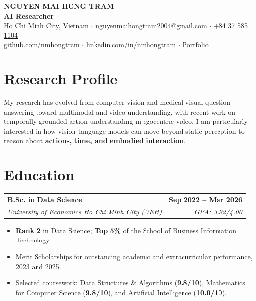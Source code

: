 \documentclass[a4paper,10pt]{article}
\makeatletter
\newcommand{\cvitem}{\itemsep0.85mm\parskip0pt\parsep0pt}
\newcommand{\bulletliststart}{\begin{itemize}[leftmargin=4.2mm,label=\raisebox{0.2ex}{\tiny$\bullet$},topsep=1.3mm] \cvitem}
\newcommand{\bulletlistend}{\end{itemize}\vspace{0.6mm}}
\newcommand{\entry}[4]{%
  \par\noindent
  \begin{tabularx}{\textwidth}{@{}Xr@{}}
    \textbf{#1} & \textbf{#2} \\
    \textit{#3} & \textit{#4}
  \end{tabularx}
  \par\vspace{0.5mm}
}
\newcommand{\email}{nguyenmaihongtram2004@gmail.com}
\newcommand{\phone}{+84 37 585 1104}
\newcommand{\github}{nmhongtram}
\newcommand{\linkedin}{nmhongtram}
\newcommand{\portfolio}{https://fair-porter-fe4.notion.site/Portfolio-Nguyen-Mai-Hong-Tram-2247aaf6f1728085be67f5484c4bef44?source=copy_link}
\makeatother
\begin{document}
\selectfont

\begin{center}
  {\LARGE\bfseries NGUYEN MAI HONG TRAM}\\[1.2mm]
  {\large\bfseries\color{accent} AI Researcher}\\[1.8mm]
  {\small
    \faMapMarker\hspace{0.8mm}Ho Chi Minh City, Vietnam
    \hspace{1.4mm}$\cdot$\hspace{1.4mm}
    \href{mailto:\email}{\faEnvelope\hspace{0.8mm}\email}
    \hspace{1.4mm}$\cdot$\hspace{1.4mm}
    \href{tel:+84375851104}{\faPhone\hspace{0.8mm}\phone}\\[0.8mm]
    \href{https://github.com/\github}{\faGithub\hspace{0.8mm}github.com/\github}
    \hspace{1.4mm}$\cdot$\hspace{1.4mm}
    \href{https://www.linkedin.com/in/\linkedin/}{\faLinkedinSquare\hspace{0.8mm}linkedin.com/in/\linkedin}
    \hspace{1.4mm}$\cdot$\hspace{1.4mm}
    \href{\portfolio}{\faGlobe\hspace{0.8mm}Portfolio}
  }
\end{center}
\vspace{0.5mm}

\section{Research Profile}
\justifying
My research has evolved from computer vision and medical visual question answering toward multimodal and video understanding, with recent work on temporally grounded action understanding in egocentric video. I am particularly interested in how vision--language models can move beyond static perception to reason about \textbf{actions, time, and embodied interaction}.

\section{Education}
\entry
  {B.Sc. in Data Science}
  {Sep 2022 -- Mar 2026}
  {University of Economics Ho Chi Minh City (UEH)}
  {GPA: 3.92/4.00}
\bulletliststart
  \item \textbf{Rank 2} in Data Science; \textbf{Top 5\%} of the School of Business Information Technology.
  \item Merit Scholarships for outstanding academic and extracurricular performance, 2023 and 2025.
  \item Selected coursework: Data Structures \& Algorithms (\textbf{9.8/10}), Mathematics for Computer Science (\textbf{9.8/10}), and Artificial Intelligence (\textbf{10.0/10}).
\bulletlistend
\end{document}

